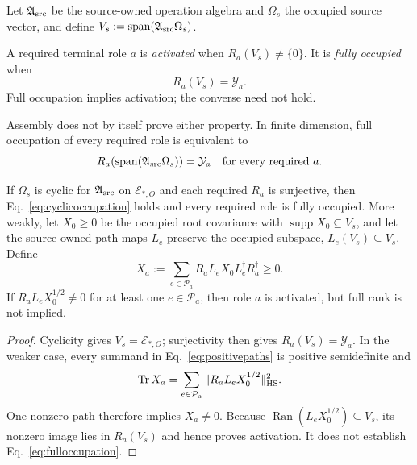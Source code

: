 Let $\mathfrak A_{\rm src}$ be the source-owned operation algebra and
$\Omega_s$ the occupied source vector, and define
$V_s:=\operatorname{span}(\mathfrak A_{\rm src}\Omega_s)$.

\begin{definition}
A required terminal role $a$ is \emph{activated} when $R_a(V_s)\neq\{0\}$.
It is \emph{fully occupied} when
\begin{equation}
R_a(V_s)=\mathcal Y_a.
\label{eq:fulloccupation}
\end{equation}
Full occupation implies activation; the converse need not hold.
\end{definition}

Assembly does not by itself prove either property.  In finite dimension, full
occupation of every required role is equivalent to
\begin{equation}
R_a\!\left(\operatorname{span}(\mathfrak A_{\rm src}\Omega_s)\right)=\mathcal Y_a
\quad\text{for every required }a.
\label{eq:cyclicoccupation}
\end{equation}

\begin{proposition}
\label{prop:occupation}
If $\Omega_s$ is cyclic for $\mathfrak A_{\rm src}$ on
$\mathcal E_{*,O}$ and each required $R_a$ is surjective, then
Eq.~\eqref{eq:cyclicoccupation} holds and every required role is fully
occupied.  More weakly, let $X_0\geq0$ be the occupied root covariance with
$\operatorname{supp}X_0\subseteq V_s$, and let the source-owned path maps
$L_e$ preserve the occupied subspace, $L_e(V_s)\subseteq V_s$.  Define
\begin{equation}
X_a:=\sum_{e\in\mathcal P_a}R_aL_eX_0L_e^\dagger R_a^\dagger\geq0.
\label{eq:positivepaths}
\end{equation}
If $R_aL_eX_0^{1/2}\neq0$ for at least one $e\in\mathcal P_a$, then role $a$
is activated, but full rank is not implied.
\end{proposition}

\begin{proof}
Cyclicity gives $V_s=\mathcal E_{*,O}$; surjectivity then gives
$R_a(V_s)=\mathcal Y_a$.  In the weaker case, every summand in
Eq.~\eqref{eq:positivepaths} is positive semidefinite and
\begin{equation}
\operatorname{Tr}X_a
=\sum_{e\in\mathcal P_a}\|R_aL_eX_0^{1/2}\|_{\rm HS}^2.
\end{equation}
One nonzero path therefore implies $X_a\neq0$.  Because
$\operatorname{Ran}(L_eX_0^{1/2})\subseteq V_s$, its nonzero image lies in
$R_a(V_s)$ and hence proves activation.  It does not establish
Eq.~\eqref{eq:fulloccupation}.
\end{proof}

